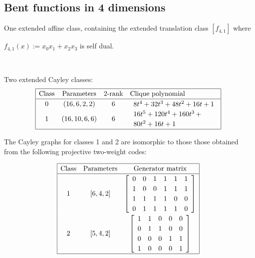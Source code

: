 \documentclass[12pt,a4paper]{article}
\begin{document}
\subsection{Bent functions in 4 dimensions}

One extended affine class, containing the extended translation class $[f_{4,1}]$ where

$f_{4,1}(x) := x_0 x_1 + x_2 x_3$ is self dual.

~

Two extended Cayley classes:
\begin{align*}
\def\arraystretch{1.2}
\begin{array}{|cccl|}
\hline
\text{Class} &
\text{Parameters} &
\text{2-rank} &
\text{Clique polynomial}
\\
\hline
0 &
(16, 6, 2, 2) &
6 &
\begin{array}{l}
8t^{4} + 32t^{3} + 48t^{2} + 16t + 1
\end{array}
\\
1 &
(16, 10, 6, 6) &
6 &
\begin{array}{l}
16t^{5} + 120t^{4} + 160t^{3}
\,+
\\
 80t^{2} + 16t + 1
\end{array}
\\
\hline
\end{array}
\end{align*}

The Cayley graphs for classes 1 and 2 are isomorphic to those those obtained from the following
projective two-weight codes:

\begin{align*}
\begin{array}{|ccc|}
\hline
\text{Class} &
\text{Parameters} & \text{Generator matrix}
\\
\hline
1 &
[6, 4, 2] &
\left[
\begin{array}{cccccc}
0 & 0 & 1 & 1 & 1 & 1
\\
1 & 0 & 0 & 1 & 1 & 1
\\
1 & 1 & 1 & 1 & 0 & 0
\\
0 & 1 & 1 & 1 & 1 & 0
\end{array}
\right]
\\
2 &
[5, 4, 2] &
\left[
\begin{array}{ccccc}
1 & 1 & 0 & 0 & 0
\\
0 & 1 & 1 & 0 & 0
\\
0 & 0 & 0 & 1 & 1
\\
1 & 0 & 0 & 0 & 1
\end{array}
\right]
\\
\hline
\end{array}
\end{align*}
\end{document}
